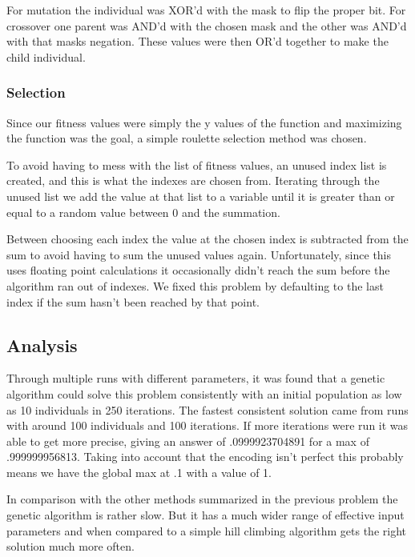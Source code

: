 For mutation the individual was XOR'd with the mask to flip the proper bit. For crossover one parent was AND'd with the chosen mask and the other was AND'd with that masks negation. These values were then OR'd together to make the child individual.

\subsubsection{Selection}
Since our fitness values were simply the y values of the function and maximizing the function was the goal, a simple roulette selection method was chosen.

To avoid having to mess with the list of fitness values, an unused index list is created, and this is what the indexes are chosen from. Iterating through the unused list we add the value at that list to a variable until it is greater than or equal to a random value between 0 and the summation.

Between choosing each index the value at the chosen index is subtracted from the sum to avoid having to sum the unused values again. Unfortunately, since this uses floating point calculations it occasionally didn't reach the sum before the algorithm ran out of indexes. We fixed this problem by defaulting to the last index if the sum hasn't been reached by that point.

\subsection{Analysis}
Through multiple runs with different parameters, it was found that a genetic algorithm could solve this problem consistently with an initial population as low as 10 individuals in 250 iterations. The fastest consistent solution came from runs with around 100 individuals and 100 iterations. If more iterations were run it was able to get more precise, giving an answer of .0999923704891 for a max of .999999956813. Taking into account that the encoding isn't perfect this probably means we have the global max at .1 with a value of 1.

In comparison with the other methods summarized in the previous problem the genetic algorithm is rather slow. But it has a much wider range of effective input parameters and when compared to a simple hill climbing algorithm gets the right solution much more often.


\newpage
